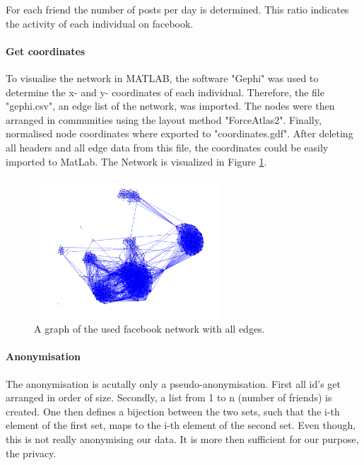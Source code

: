 For each friend the number of posts per day is determined. This ratio indicates the activity of each individual on facebook. 

\paragraph{Get coordinates}
To visualise the network in MATLAB, the software "Gephi" was used to determine the x- and y- coordinates of each individual. Therefore, the file "gephi.csv", an edge list of the network, was imported. The nodes were then arranged in communities using the layout method "ForceAtlas2". Finally, normalised node coordinates where exported to "coordinates.gdf". After deleting all headers and all edge data from this file, the coordinates could be easily imported to MatLab. The Network is visualized in Figure \ref{Network-Graph}.

\begin{figure}
\begin{center}
\includegraphics[width=7cm]{Network-Graph}
\caption{A graph of the used facebook network with all edges.}
\label{Network-Graph}
\end{center}
\end{figure}

\paragraph{Anonymisation}

The anonymisation is acutally only a pseudo-anonymisation. First all id's get arranged in order of size. Secondly, a list from 1 to n (number of friends) is created. One then defines a bijection between the two sets, such that the i-th element of the first set, maps to the i-th element of the second set. Even though, this is not really anonymising our data. It is more then sufficient for our purpose, the privacy.



\clearpage
